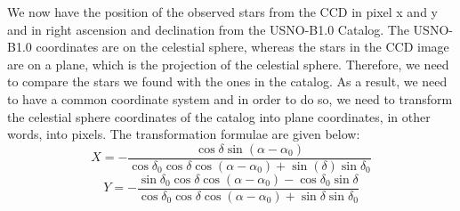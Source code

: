 \documentclass[letterpaper,12pt]{article}
\begin{document}
We now have the position of the observed stars from the CCD in pixel x and y and in right ascension and declination from the USNO-B1.0 Catalog. The USNO-B1.0 coordinates are on the celestial sphere, whereas the stars in the CCD image are on a plane, which is the projection of the celestial sphere. Therefore, we need to compare the stars we found with the ones in the catalog. As a result, we need to have a common coordinate system and in order to do so, we need to transform the celestial sphere coordinates of the catalog into plane coordinates, in other words, into pixels. The transformation formulae are given below:
\begin{equation}
X=- \frac{\cos \delta\sin (\alpha-\alpha_{0})}{\cos \delta_{0}\cos \delta\cos(\alpha-\alpha_{0})+\sin(\delta)\sin\delta_{0}}
\end{equation}
\begin{equation}
Y=- \frac{\sin\delta_{0}\cos\delta\cos(\alpha-\alpha_{0})-\cos\delta_{0}\sin\delta}{\cos \delta_{0}\cos \delta\cos(\alpha-\alpha_{0})+\sin\delta\sin\delta_{0}}
\end{equation}                                    
\end{document}
